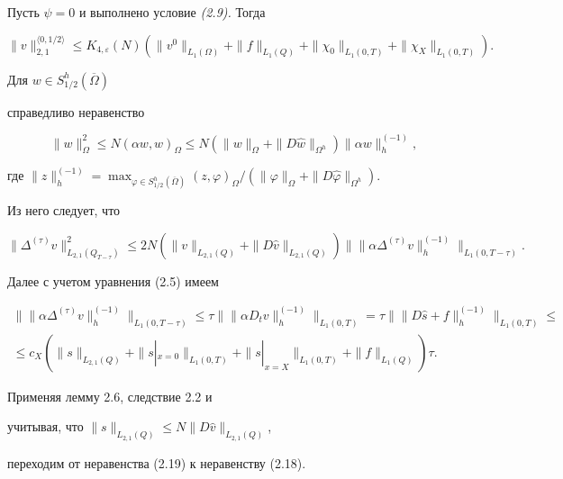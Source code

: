 \documentclass[12pt]{article}
\newcommand{\ve}{\varepsilon}
\theoremstyle{plain} %
\newtheorem{lemm}{\hskip\parindent Лемма}[section]
\theoremstyle{definition}
\numberwithin{equation}{section}
\begin{document}
\begin{lemm} Пусть $\psi=0$ и выполнено условие {\em (2.9).} Тогда


\begin{equation}


\|v\|_{2,1}^{\langle 0,1/2\rangle}\le


 K_{4,\ve}(N)(\|v^0\|_{L_1(\Omega)}+\|f\|_{L_1(Q)}+


\|\chi_0\|_{L_1(0,T)}+\|\chi_X\|_{L_1(0,T)}).


\end{equation}


\end{lemm}





\begin{pf} Для $w\in S^h_{1/2}(\overline\Omega)$


справедливо неравенство


$$


\|w\|^2_\Omega\le N(\alpha w,w)_\Omega\le


N(\|w\|_\Omega+\|D\widehat w\|_{\Omega^h})\|\alpha w\|^{(-1)}_h,


$$


где $\|z\|^{(-1)}_h=\max_{\varphi\in S^h_{1/2}(\overline\Omega)}


(z,\varphi)_\Omega\bigr/(\|\varphi\|_\Omega+\|D\widehat\varphi\|_{\Omega^h})$.


Из него следует, что


\begin{equation}


\|\Delta^{(\tau)}v\|^2_{L_{2,1}(Q_{T-\tau})}\le


2N(\|v\|_{L_{2,1}(Q)}+ \|D\widehat v\|_{L_{2,1}(Q)})


\bigl\|\|\alpha\Delta^{(\tau)}v\|^{(-1)}_h\bigr\|_{L_1(0,T-\tau)}.


\end{equation}


Далее с учетом уравнения (2.5) имеем


\begin{multline*}


\bigl\|\|\alpha\Delta^{(\tau)}v\|^{(-1)}_h\bigr\|_{L_1(0,T-\tau)}\le


\tau\bigl\|\|\alpha D_tv\|^{(-1)}_h\bigr\|_{L_1(0,T)}=


\tau\bigl\|\|D\widehat s+f\|^{(-1)}_h\bigr\|_{L_1(0,T)}\le\\


%


\le c_X(\|s\|_{L_{2,1}(Q)}+\|s|_{x=0}\|_{L_1(0,T)}


+\|s|_{x=X}\|_{L_1(0,T)} +\|f\|_{L_1(Q)})\tau.


\end{multline*}


Применяя лемму 2.6, следствие 2.2 и


учитывая, что $\|s\|_{L_{2,1}(Q)}\le N \|D\widehat v\|_{L_{2,1}(Q)}$,


переходим от неравенства (2.19) к неравенству (2.18).


\end{pf}
\end{document}
